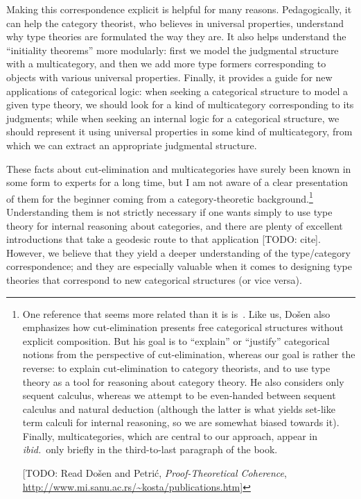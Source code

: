 \documentclass{book}
\begin{document}
Making this correspondence explicit is helpful for many reasons.
Pedagogically, it can help the category theorist, who believes in universal properties, understand why type theories are formulated the way they are.
It also helps understand the ``initiality theorems'' more modularly: first we model the judgmental structure with a multicategory, and then we add more type formers corresponding to objects with various universal properties.
Finally, it provides a guide for new applications of categorical logic: when seeking a categorical structure to model a given type theory, we should look for a kind of multicategory corresponding to its judgments; while when seeking an internal logic for a categorical structure, we should represent it using universal properties in some kind of multicategory, from which we can extract an appropriate judgmental structure.

These facts about cut-elimination and multicategories have surely been known in some form to experts for a long time, but I am not aware of a clear presentation of them for the beginner coming from a category-theoretic background.\footnote{One reference that seems more related than it is is~\cite{dosen:cutelim-cats}.
  Like us, Do\v{s}en also emphasizes how cut-elimination presents free categorical structures without explicit composition.
  But his goal is to ``explain'' or ``justify'' categorical notions from the perspective of cut-elimination, whereas our goal is rather the reverse: to explain cut-elimination to category theorists, and to use type theory as a tool for reasoning about category theory.
  He also considers only sequent calculus, whereas we attempt to be even-handed between sequent calculus and natural deduction (although the latter is what yields set-like term calculi for internal reasoning, so we are somewhat biased towards it).
  Finally, multicategories, which are central to our approach, appear in \textit{ibid.}\ only briefly in the third-to-last paragraph of the book.

  [TODO: Read Do\v{s}en and Petri\'{c}, \textit{Proof-Theoretical Coherence}, \url{http://www.mi.sanu.ac.rs/~kosta/publications.htm}]}
Understanding them is not strictly necessary if one wants simply to use type theory for internal reasoning about categories, and there are plenty of excellent introductions that take a geodesic route to that application [TODO: cite].
However, we believe that they yield a deeper understanding of the type/category correspondence; and they are especially valuable when it comes to designing type theories that correspond to new categorical structures (or vice versa).
\end{document}
